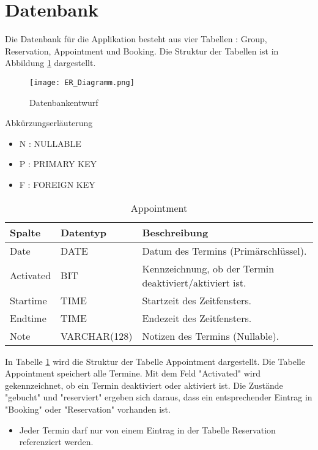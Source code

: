 \graphicspath{ {Entwurf/exports/png/} }

\section{Datenbank}
Die Datenbank für die Applikation besteht aus vier Tabellen : Group, Reservation, Appointment und Booking.
Die Struktur der Tabellen ist in Abbildung \ref{fig:ER-Diagramm} dargestellt.

\begin{figure}[ht]
	\centering
	\texttt{[image: ER\_Diagramm.png]}
	\caption{Datenbankentwurf}
	\label{fig:ER-Diagramm}
\end{figure}

Abkürzungserläuterung
\begin{itemize}
\item N : NULLABLE
\item P : PRIMARY KEY
\item F : FOREIGN KEY
\end{itemize}

\begin{table}[h]
	\centering
	\caption{Appointment}
	\label{tab:Appointment}
    \begin{tabular}{| p{2cm} | p{3cm} | p{10cm} |}
    \hline
    \rowcolor{lightgray} Spalte & Datentyp & Beschreibung  \\ \hline
    Date  & DATE & Datum des Termins (Primärschlüssel).\\ \hline
    Activated & BIT & Kennzeichnung, ob der Termin deaktiviert/aktiviert ist.\\ \hline
    Startime & TIME & Startzeit des Zeitfensters. \\ \hline
    Endtime & TIME & Endezeit des Zeitfensters.  \\ \hline
    Note & VARCHAR(128) & Notizen des Termins (Nullable). \\ \hline
    \end{tabular}
\end{table}

In Tabelle \ref{tab:Appointment} wird die Struktur der Tabelle Appointment dargestellt. Die Tabelle Appointment speichert alle Termine. Mit dem Feld "Activated" wird gekennzeichnet, ob ein Termin deaktiviert oder aktiviert ist. Die Zustände "gebucht" und "reserviert" ergeben sich daraus, dass ein entsprechender Eintrag in "Booking" oder "Reservation" vorhanden ist.
\begin{itemize}
	\item Jeder Termin darf nur von einem Eintrag in der Tabelle Reservation referenziert werden.
\end{itemize}

